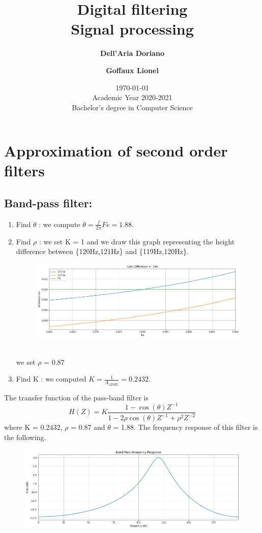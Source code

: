 \documentclass[]{article}
\title{
{\Huge Digital filtering}\\
Signal processing\\
}
\author{
\textbf{Dell’Aria Doriano}\\
\and
\textbf{Goffaux Lionel}
}
\date{\today\\
Academic Year 2020-2021\\
Bachelor's degree in Computer Science}
\begin{document}
\maketitle

\section{Approximation of second order filters}
\subsection*{Band-pass filter:}
\begin{enumerate}
    \item Find $\theta$ : we compute $\theta = \frac{f}{2\pi}Fe = 1.88$.
    \item Find $\rho$ : we set K = 1 and we draw this graph representing the height difference between \{120Hz,121Hz\} and \{119Hz,120Hz\}.
    \begin{figure}[h]
        \centering
        \includegraphics[scale=0.5]{q11.png}
    \end{figure}\\
    we set $\rho$ = 0.87
    \item Find K : we computed $K = \frac{1}{A_{120Hz}}=0.2432$.
\end{enumerate}
The transfer function of the pass-band filter is 
$$H(Z) = K\frac{1 - \cos{(\theta)} Z^{-1}}{1 - 2\rho \cos{(\theta)Z^{-1} +\rho^2Z^{-2}}}$$
where K = 0.2432, $\rho$ = 0.87 and $\theta$ = 1.88. The frequency response of this filter is the following.
\begin{figure}[h]
    \centering
    \includegraphics[scale=0.5]{q12.png}
\end{figure}\\
\end{document}

